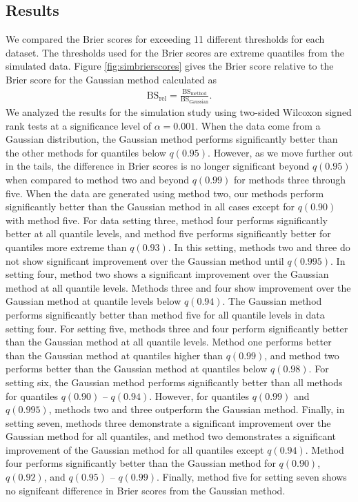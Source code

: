 \documentclass[11pt]{article}
\begin{document}
\subsection{Results}\label{s:simresults}
We compared the Brier scores for exceeding 11 different thresholds for each dataset.
The thresholds used for the Brier scores are extreme quantiles from the simulated data.
Figure \ref{fig:simbrierscores} gives the Brier score relative to the Brier score for the Gaussian method calculated as
\begin{align}
  \text{BS}_{\text{rel}} = \frac{\text{BS}_{\text{method}}}{\text{BS}_{\text{Gaussian}}}.
\end{align}
We analyzed the results for the simulation study using two-sided Wilcoxon signed rank tests at a significance level of $\alpha = 0.001$.
When the data come from a Gaussian distribution, the Gaussian method performs significantly better than the other methods for quantiles below $q(0.95)$.
However, as we move further out in the tails, the difference in Brier scores is no longer significant beyond $q(0.95)$ when compared to method two and beyond $q(0.99)$ for methods three through five.
When the data are generated using method two, our methods perform significantly better than the Gaussian method in all cases except for $q(0.90)$ with method five.
For data setting three, method four performs significantly better at all quantile levels, and method five performs significantly better for quantiles more extreme than $q(0.93)$.
In this setting, methods two and three do not show significant improvement over the Gaussian method until $q(0.995)$.
In setting four, method two shows a significant improvement over the Gaussian method at all quantile levels.
Methods three and four show improvement over the Gaussian method at quantile levels below $q(0.94)$.
The Gaussian method performs significantly better than method five for all quantile levels in data setting four.
For setting five, methods three and four perform significantly better than the Gaussian method at all quantile levels.
Method one performs better than the Gaussian method at quantiles higher than $q(0.99)$, and method two performs better than the Gaussian method at quantiles below $q(0.98)$.
For setting six, the Gaussian method performs significantly better than all methods for quantiles $q(0.90)$ -- $q(0.94)$.
However, for quantiles $q(0.99)$ and $q(0.995)$, methods two and three outperform the Gaussian method.
Finally, in setting seven, methods three demonstrate a significant improvement over the Gaussian method for all quantiles, and method two demonstrates a significant improvement of the Gaussian method for all quantiles except $q(0.94)$.
Method four performs significantly better than the Gaussian method for $q(0.90)$, $q(0.92)$, and $q(0.95)$ -- $q(0.99)$.
Finally, method five for setting seven shows no signifcant difference in Brier scores from the Gaussian method.
\end{document}
